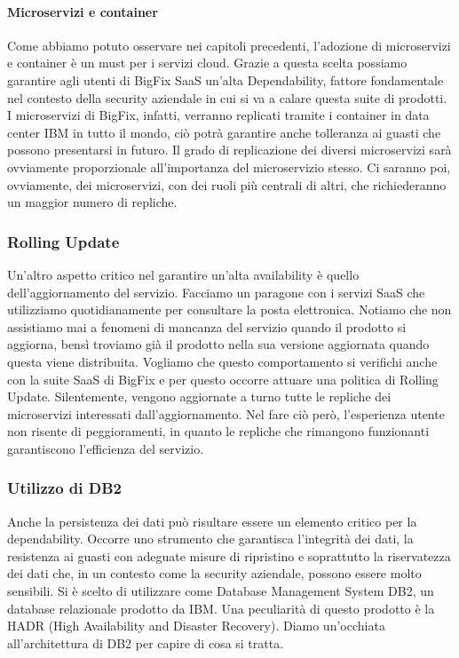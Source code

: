 \paragraph{Microservizi e container}
Come abbiamo potuto osservare nei capitoli precedenti, l'adozione di microservizi e container è un must per i servizi cloud. Grazie a questa scelta possiamo garantire agli utenti di BigFix SaaS un'alta Dependability, fattore fondamentale nel contesto della security aziendale in cui si va a calare questa suite di prodotti. I microservizi di BigFix, infatti, verranno replicati tramite i container in data center IBM in tutto il mondo, ciò potrà garantire anche tolleranza ai guasti che possono presentarsi in futuro. Il grado di replicazione dei diversi microservizi sarà ovviamente proporzionale all'importanza del microservizio stesso. Ci saranno poi, ovviamente, dei microservizi, con dei ruoli più centrali di altri, che richiederanno un maggior numero di repliche.

\subsubsection{Rolling Update}
Un'altro aspetto critico nel garantire un'alta availability è quello dell'aggiornamento del servizio. Facciamo un paragone con i servizi SaaS che utilizziamo quotidianamente per consultare la posta elettronica. Notiamo che non assistiamo mai a fenomeni di mancanza del servizio quando il prodotto si aggiorna, bensì troviamo già il prodotto nella sua versione aggiornata quando questa viene distribuita. Vogliamo che questo comportamento si verifichi anche con la suite SaaS di BigFix e per questo occorre attuare una politica di Rolling Update. Silentemente, vengono aggiornate a turno tutte le repliche dei microservizi interessati dall'aggiornamento. Nel fare ciò però, l'esperienza utente non risente di peggioramenti, in quanto le repliche che rimangono funzionanti garantiscono l'efficienza del servizio.

\subsubsection{Utilizzo di DB2}
Anche la persistenza dei dati può risultare essere un elemento critico per la dependability. Occorre uno strumento che garantisca l'integrità dei dati, la resistenza ai guasti con adeguate misure di ripristino e soprattutto la riservatezza dei dati che, in un contesto come la security aziendale, possono essere molto sensibili. Si è scelto di utilizzare come Database Management System DB2, un database relazionale prodotto da IBM. Una peculiarità di questo prodotto è la HADR (High Availability and Disaster Recovery). Diamo un'occhiata all'architettura di DB2 per capire di cosa si tratta.

